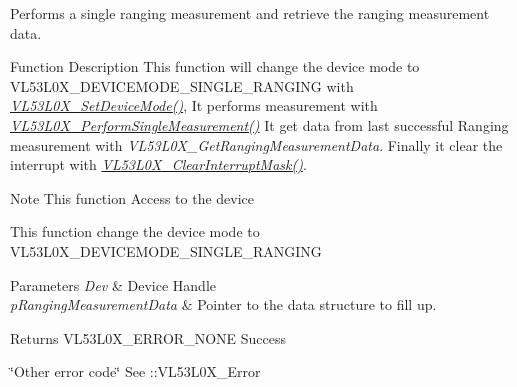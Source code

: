 Performs a single ranging measurement and retrieve the ranging measurement data. 

\begin{DoxyParagraph}{Function Description}
This function will change the device mode to V\+L53\+L0\+X\+\_\+\+D\+E\+V\+I\+C\+E\+M\+O\+D\+E\+\_\+\+S\+I\+N\+G\+L\+E\+\_\+\+R\+A\+N\+G\+I\+NG with {\itshape \hyperlink{group__VL53L0X__parameters__group_ga547bf7479b5ec799db4aafb7111271f7}{V\+L53\+L0\+X\+\_\+\+Set\+Device\+Mode()}}, It performs measurement with {\itshape \hyperlink{group__VL53L0X__measurement__group_gad56ed8d1403da5d203e2418a1f57fa81}{V\+L53\+L0\+X\+\_\+\+Perform\+Single\+Measurement()}} It get data from last successful Ranging measurement with {\itshape V\+L53\+L0\+X\+\_\+\+Get\+Ranging\+Measurement\+Data}. Finally it clear the interrupt with {\itshape \hyperlink{group__VL53L0X__interrupt__group_gaa84b2cf5cd87b118b9a43e7ae764447e}{V\+L53\+L0\+X\+\_\+\+Clear\+Interrupt\+Mask()}}.
\end{DoxyParagraph}
\begin{DoxyNote}{Note}
This function Access to the device

This function change the device mode to V\+L53\+L0\+X\+\_\+\+D\+E\+V\+I\+C\+E\+M\+O\+D\+E\+\_\+\+S\+I\+N\+G\+L\+E\+\_\+\+R\+A\+N\+G\+I\+NG
\end{DoxyNote}

\begin{DoxyParams}{Parameters}
{\em Dev} & Device Handle \\
\hline
{\em p\+Ranging\+Measurement\+Data} & Pointer to the data structure to fill up. \\
\hline
\end{DoxyParams}
\begin{DoxyReturn}{Returns}
V\+L53\+L0\+X\+\_\+\+E\+R\+R\+O\+R\+\_\+\+N\+O\+NE Success 

\char`\"{}\+Other error code\char`\"{} See \+::\+V\+L53\+L0\+X\+\_\+\+Error 
\end{DoxyReturn}
\mbox{\label{group__VL53L0X__measurement__group_ga5f0f4a2846a8ecf746aa25f738e6b442}} 

